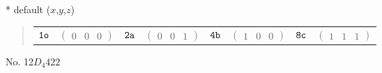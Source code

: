 \documentclass[fleqn,9pt,landscape]{jsarticle}
\begin{document}
* default ($x$,$y$,$z$)
\begin{quote}
\begin{tabular}{cccccccc}
$ {\tt 1o} $ & $ \begin{pmatrix} 0 & 0 & 0 \end{pmatrix} $ & $ {\tt 2a} $ & $ \begin{pmatrix} 0 & 0 & 1 \end{pmatrix} $ & $ {\tt 4b} $ & $ \begin{pmatrix} 1 & 0 & 0 \end{pmatrix} $ & $ {\tt 8c} $ & $ \begin{pmatrix} 1 & 1 & 1 \end{pmatrix} $
\end{tabular}
\end{quote}
\newpage
No. 12\quad$D_{4}$\quad$422$\quad[ tetragonal ]
\end{document}
